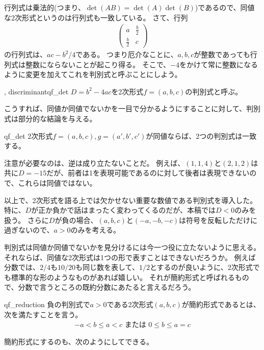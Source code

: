 行列式は乗法的(つまり、$\det(AB)=\det(A)\det(B)$)であるので、同値な2次形式というのは行列式も一致している。
さて、行列
\begin{align*}
\begin{pmatrix}
a & \frac{b}{2}\\
\frac{b}{2} & c
\end{pmatrix}
\end{align*}
の行列式は、$ac-b^2/4$である。
つまり厄介なことに、$a,b,c$が整数であっても行列式は整数にならないことが起こり得る。
そこで、$-4$をかけて常に整数になるように変更を加えてこれを判別式と呼ぶことにしよう。

\begin{Defi}{, discriminant}{qf_det}
$D=b^2-4ac$を2次形式$f=(a,b,c)$の判別式と呼ぶ。
\end{Defi}

こうすれば、同値か同値でないかを一目で分かるようにすることに対して、判別式は部分的な結論を与える。

\begin{Prop}{}{qf_det}
2次形式$f=(a,b,c),g=(a',b',c')$が同値ならば、2つの判別式は一致する。
\end{Prop}

注意が必要なのは、逆は成り立たないことだ。
例えば、$(1,1,4)$と$(2,1,2)$は共に$D=-15$だが、前者は1を表現可能であるのに対して後者は表現できないので、これらは同値ではない。

以上で、2次形式を語る上では欠かせない重要な数値である判別式を導入した。
特に、$D$が正か負かで話はまったく変わってくるのだが、本稿では$D<0$のみを扱う。
さらに$D$が負の場合、$(a,b,c)$と$(-a,-b,-c)$は符号を反転しただけに過ぎないので、$a>0$のみを考える。

判別式は同値か同値でないかを見分けるには今一つ役に立たないように思える。
それならば、同値な2次形式は1つの形で表すことはできないだろうか。
例えば分数では、$2/4$も$10/20$も同じ数を表して、$1/2$とするのが良いように、2次形式でも標準的な形のようなものがあれば嬉しい。
それが簡約形式と呼ばれるもので、分数で言うところの既約分数にあたると言えるだろう。

\begin{Defi}{}{qf_reduction}
負の判別式で$a>0$である2次形式$(a,b,c)$が簡約形式であるとは、次を満たすことを言う。
\begin{align*}
-a < b \le a < c \mbox{ または } 0 \le b \le a = c
\end{align*}
\end{Defi}

簡約形式にするのも、次のようにしてできる。

